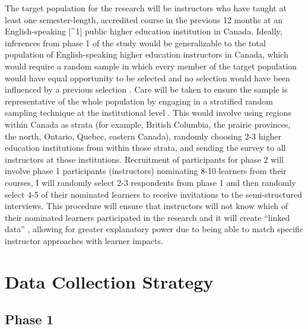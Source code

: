 \documentclass[
]{book}
\begin{document}
The target population for the research will be instructors who have taught at least one semester-length, accredited course in the previous 12 months at an English-speaking {[}\^{}1{]} public higher education institution in Canada. Ideally, inferences from phase 1 of the study would be generalizable to the total population of English-speaking higher education instructors in Canada, which would require a random sample in which every member of the target population would have equal opportunity to be selected and no selection would have been influenced by a previous selection \citep{hibbertsCommonSurveySampling2012, rencklyAirUniversitySampling2002}. Care will be taken to ensure the sample is representative of the whole population by engaging in a stratified random sampling technique at the institutional level \citep{hibbertsCommonSurveySampling2012}. This would involve using regions within Canada as strata (for example, British Columbia, the prairie provinces, the north, Ontario, Quebec, eastern Canada), randomly choosing 2-3 higher education institutions from within those strata, and sending the survey to all instructors at those institutions. Recruitment of participants for phase 2 will involve phase 1 participants (instructors) nominating 8-10 learners from their courses, I will randomly select 2-3 respondents from phase 1 and then randomly select 4-5 of their nominated learners to receive invitations to the semi-structured interviews. This procedure will ensure that instructors will not know which of their nominated learners participated in the research and it will create ``linked data'' \citeyearpar[p.~126]{bazeleyIntegratingAnalysesMixed2018}, allowing for greater explanatory power due to being able to match specific instructor approaches with learner impacts.

\hypertarget{data-collection-strategy}{%
\section{Data Collection Strategy}\label{data-collection-strategy}}

\hypertarget{phase-1}{%
\subsection{Phase 1}\label{phase-1}}
\end{document}
